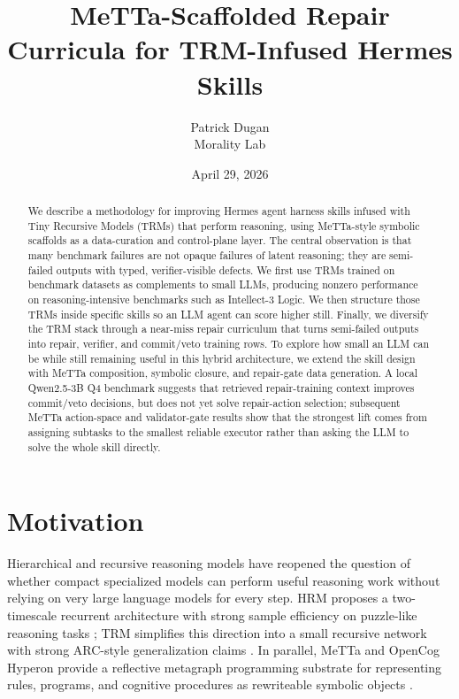 \documentclass[11pt]{article}
\title{MeTTa-Scaffolded Repair Curricula for TRM-Infused Hermes Skills}
\author{Patrick Dugan\\Morality Lab}
\date{April 29, 2026}
\begin{document}
\maketitle

\begin{abstract}
We describe a methodology for improving Hermes agent harness skills infused with Tiny Recursive Models (TRMs) that perform reasoning, using MeTTa-style symbolic scaffolds as a data-curation and control-plane layer. The central observation is that many benchmark failures are not opaque failures of latent reasoning; they are semi-failed outputs with typed, verifier-visible defects. We first use TRMs trained on benchmark datasets as complements to small LLMs, producing nonzero performance on reasoning-intensive benchmarks such as Intellect-3 Logic. We then structure those TRMs inside specific skills so an LLM agent can score higher still. Finally, we diversify the TRM stack through a near-miss repair curriculum that turns semi-failed outputs into repair, verifier, and commit/veto training rows. To explore how small an LLM can be while still remaining useful in this hybrid architecture, we extend the skill design with MeTTa composition, symbolic closure, and repair-gate data generation. A local Qwen2.5-3B Q4 benchmark suggests that retrieved repair-training context improves commit/veto decisions, but does not yet solve repair-action selection; subsequent MeTTa action-space and validator-gate results show that the strongest lift comes from assigning subtasks to the smallest reliable executor rather than asking the LLM to solve the whole skill directly.
\end{abstract}

\section{Motivation}

Hierarchical and recursive reasoning models have reopened the question of whether compact specialized models can perform useful reasoning work without relying on very large language models for every step. HRM proposes a two-timescale recurrent architecture with strong sample efficiency on puzzle-like reasoning tasks \citep{wang2025hrm}; TRM simplifies this direction into a small recursive network with strong ARC-style generalization claims \citep{jolicoeurmartineau2025trm}. In parallel, MeTTa and OpenCog Hyperon provide a reflective metagraph programming substrate for representing rules, programs, and cognitive procedures as rewriteable symbolic objects \citep{goertzel2021metta,meredith2023metametta}.
\end{document}
